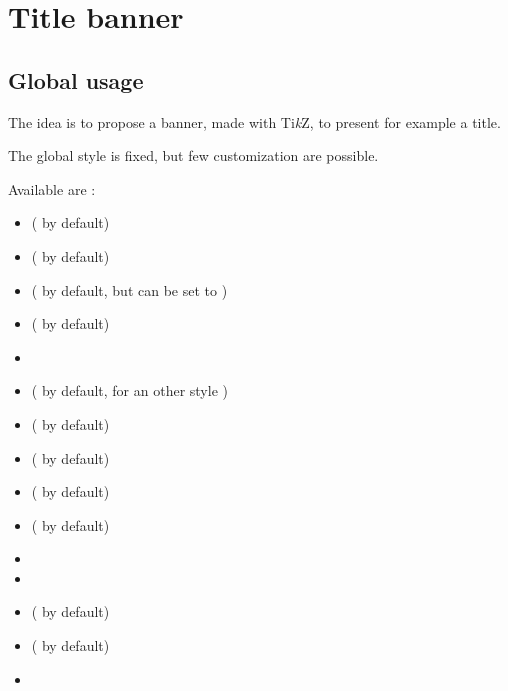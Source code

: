 \documentclass[english,11pt,a4paper]{article}
\providecommand\tikzlogo{Ti\textit{k}Z}
\let\TikZ\tikzlogo
\begin{document}
\pagebreak

\section{Title banner}

\subsection{Global usage}

The idea is to propose a banner, made with \TikZ, to present for example a title.

The global style is fixed, but few customization are possible.

\begin{codehigh}[language=latex/latex3,style/main=teal!25,style/code=teal!25]
\end{codehigh}

\begin{demohigh}[language=latex/latex3,style/main=teal!25,style/code=teal!25]
\end{demohigh}

Available  are :

\begin{itemize}
	\item {} (\MontreCode{2.5em} by default)
	\item {} ( by default)
	\item {} (\MontreCode{2.75em} by default, but can be set to )
	\item {} ( by default)
	\item {}
	\item {} ( by default, for an other style )
	\item {} ( by default)
	\item {} ( by default)
	\item {} ( by default)
	\item {} ( by default)
	\item {}
	\item {}
	\item {} ( by default)
	\item {} (  by default)
	\item {}
\end{itemize}
\end{document}
